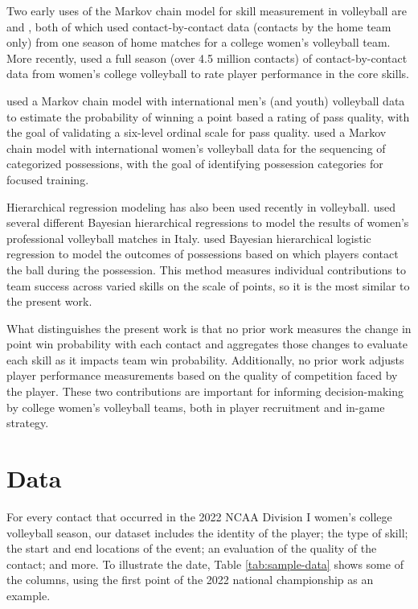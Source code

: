 \documentclass{article}
\begin{document}
Two early uses of the Markov chain model for skill measurement in volleyball are \citet{florence_etal_2008} and \citet{miskin_etal_2010}, both of which used contact-by-contact data (contacts by the home team only) from one season of home matches for a college women's volleyball team. More recently, \citet{bagley_ware_2017} used a full season (over 4.5 million contacts) of contact-by-contact data from women's college volleyball to rate player performance in the core skills.

\citet{drikos_2018} used a Markov chain model with international men's (and youth) volleyball data to estimate the probability of winning a point based a rating of pass quality, with the goal of validating a six-level ordinal scale for pass quality. \citet{hileno_etal_2020} used a Markov chain model with international women's volleyball data for the sequencing of categorized possessions, with the goal of identifying possession categories for focused training.

Hierarchical regression modeling has also been used recently in volleyball. \citet{gabrio_2021} used several different Bayesian hierarchical regressions to model the results of women's professional volleyball matches in Italy. \citet{fellingham_2022} used Bayesian hierarchical logistic regression to model the outcomes of possessions based on which players contact the ball during the possession. This method measures individual contributions to team success across varied skills on the scale of points, so it is the most similar to the present work.

What distinguishes the present work is that no prior work measures the change in point win probability with each contact and aggregates those changes to evaluate each skill as it impacts team win probability. Additionally, no prior work adjusts player performance measurements based on the quality of competition faced by the player. These two contributions are important for informing decision-making by college women's volleyball teams, both in player recruitment and in-game strategy.


\section{Data}
\label{sec:data}

For every contact that occurred in the 2022 NCAA Division I women's college volleyball season, our dataset includes the identity of the player; the type of skill; the start and end locations of the event; an evaluation of the quality of the contact; and more. To illustrate the date, Table \ref{tab:sample-data} shows some of the columns, using the first point of the 2022 national championship as an example.
\end{document}
